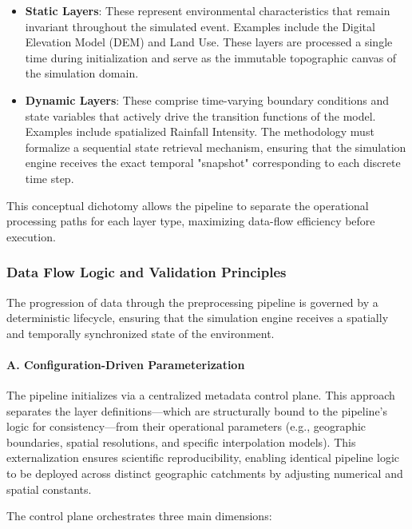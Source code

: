 \begin{itemize}
    \item \textbf{Static Layers}: These represent environmental characteristics that remain invariant throughout the simulated event. 
    Examples include the Digital Elevation Model (DEM) and Land Use. These layers are processed a single time during 
    initialization and serve as the immutable topographic canvas of the simulation domain.

    \item \textbf{Dynamic Layers}: These comprise time-varying boundary conditions and state variables that actively drive the transition 
    functions of the model. Examples include spatialized Rainfall Intensity. The methodology must formalize a sequential state retrieval 
    mechanism, ensuring that the simulation engine receives the exact temporal "snapshot" corresponding to each discrete time step.
\end{itemize}

This conceptual dichotomy allows the pipeline to separate the operational processing paths for each layer type, maximizing data-flow 
efficiency before execution.

\subsubsection{Data Flow Logic and Validation Principles}

The progression of data through the preprocessing pipeline is governed by a deterministic lifecycle, ensuring that the simulation engine 
receives a spatially and temporally synchronized state of the environment.

\paragraph{A. Configuration-Driven Parameterization}

The pipeline initializes via a centralized metadata control plane. This approach separates the layer definitions—which are structurally 
bound to the pipeline's logic for consistency—from their operational parameters (e.g., geographic boundaries, spatial resolutions, and 
specific interpolation models). This externalization ensures scientific reproducibility, enabling identical pipeline logic to be deployed 
across distinct geographic catchments by adjusting numerical and spatial constants.

The control plane orchestrates three main dimensions:

